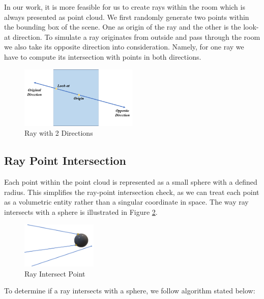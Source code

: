 \documentclass[11pt, a4paper,oneside,chapterprefix=false]{scrbook}
\begin{document}
\vspace{10pt}

In our work, it is more feasible for us to create rays within the room which is always presented as point cloud. We first randomly generate two points within the bounding box of the scene. One as origin of the ray and the other is the look-at direction. To simulate a ray originates from outside and pass through the room we also take its opposite direction into consideration. Namely, for one ray we have to compute its intersection with points in both directions. 

\begin{figure}[H]
    \centering
    \includegraphics*[width=0.5\textwidth]{figures/ray with two directions.png}
    \caption{Ray with 2 Directions}
    \label{fig:ray with 2 directions}
\end{figure}

\subsection{Ray Point Intersection} \label{ray point intersection}

Each point within the point cloud is represented as a small sphere with a defined radius. This simplifies the ray-point intersection check, as we can treat each point as a volumetric entity rather than a singular coordinate in space. The way ray intersects with a sphere is illustrated in Figure \ref{fig:ray intersect point}. 

\begin{figure}[H]
    \centering
    \includegraphics*[width=0.32\textwidth]{figures/ray intersect point.png}
    \caption{Ray Intersect Point}
    \label{fig:ray intersect point}
\end{figure}

To determine if a ray intersects with a sphere, we follow algorithm stated below:
\end{document}
